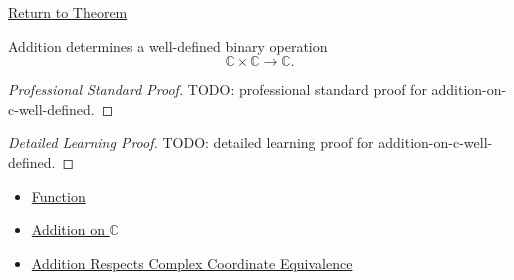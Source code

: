 \newpage
{}
\label{prf:addition-on-c-well-defined}

\begin{remark*}[Return]
\hyperref[thm:addition-on-c-well-defined]{Return to Theorem}
\end{remark*}

\begin{theorem*}
Addition determines a well-defined binary operation
\[
\mathbb{C}\times\mathbb{C}\to\mathbb{C}.
\]
\end{theorem*}

\begin{proof}[Professional Standard Proof]
\LRAProofBodyStart
TODO: professional standard proof for addition-on-c-well-defined.
\end{proof}

\begin{proof}[Detailed Learning Proof]
\LRAProofBodyStart
TODO: detailed learning proof for addition-on-c-well-defined.
\end{proof}

\begin{remark*}
\end{remark*}

\begin{dependencies}
\begin{itemize}
  \item \hyperref[def:function]{Function}
  \item \hyperref[def:addition-on-c-classes]{Addition on $\mathbb{C}$}
  \item \hyperref[lem:addition-on-c-respects-equivalence]{Addition Respects Complex Coordinate Equivalence}
\end{itemize}
\end{dependencies}

\clearpage
